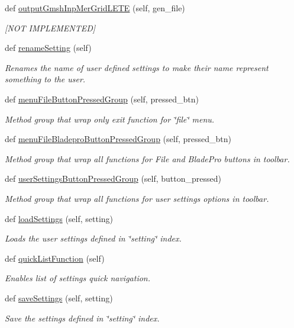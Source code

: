 \begin{DoxyCompactItemize}
def \hyperlink{a00071_aa07573686af3bd04e4ff42c3dddcf975}{output\+Gmsh\+Inp\+Mer\+Grid\+L\+E\+TE} (self, gen\+\_\+file)
\begin{DoxyCompactList}\small\item\em \mbox{[}N\+OT I\+M\+P\+L\+E\+M\+E\+N\+T\+ED\mbox{]} \end{DoxyCompactList}\item 
def \hyperlink{a00071_a464a8ac16bcb67d41a6d91ee8b51acf2}{rename\+Setting} (self)
\begin{DoxyCompactList}\small\item\em Renames the name of user defined settings to make their name represent something to the user. \end{DoxyCompactList}\item 
def \hyperlink{a00071_a35cf87c6230239ce47b33bda03bd7432}{menu\+File\+Button\+Pressed\+Group} (self, pressed\+\_\+btn)
\begin{DoxyCompactList}\small\item\em Method group that wrap only exit function for \char`\"{}file\char`\"{} menu. \end{DoxyCompactList}\item 
def \hyperlink{a00071_ad94f49b4827a3ea0b56070e0149ae2aa}{menu\+File\+Bladepro\+Button\+Pressed\+Group} (self, pressed\+\_\+btn)
\begin{DoxyCompactList}\small\item\em Method group that wrap all functions for File and Blade\+Pro buttons in toolbar. \end{DoxyCompactList}\item 
def \hyperlink{a00071_a1b508dd4cb9c699a1769e7727d1e6fc1}{user\+Settings\+Button\+Pressed\+Group} (self, button\+\_\+pressed)
\begin{DoxyCompactList}\small\item\em Method group that wrap all functions for user settings options in toolbar. \end{DoxyCompactList}\item 
def \hyperlink{a00071_a0c4f30850537553db0ff2e27059733a4}{load\+Settings} (self, setting)
\begin{DoxyCompactList}\small\item\em Loads the user settings defined in \char`\"{}setting\char`\"{} index. \end{DoxyCompactList}\item 
def \hyperlink{a00071_a0e71786a8b6fe43e6a01ff388c34ce18}{quick\+List\+Function} (self)
\begin{DoxyCompactList}\small\item\em Enables list of settings quick navigation. \end{DoxyCompactList}\item 
def \hyperlink{a00071_a723573fade09f206a9c89569885558c1}{save\+Settings} (self, setting)
\begin{DoxyCompactList}\small\item\em Save the settings defined in \char`\"{}setting\char`\"{} index. \end{DoxyCompactList}\end{DoxyCompactItemize}
